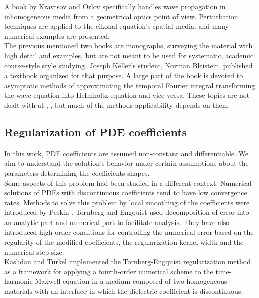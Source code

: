 \documentclass[12pt,twoside]{report}
\begin{document}
A book by Kravtsov and Orlov \cite{KravstovOrlov1990} specifically handles wave propagation in inhomogeneous media from a geometrical optics point of view. Perturbation techniques are applied to the eikonal equation's spatial media. and many numerical examples are presented. \\

The previous mentioned two books are monographs, surveying the material with high detail and examples, but are not meant to be used for systematic, academic course-style style studying. Joseph Keller's student, Norman Bleistein, published a textbook \cite{Bleistein1984} organized for that purpose. A large part of the book is devoted to asymptotic methods of approximating the temporal Fourier integral transforming the wave equation into Helmholtz equation and vice versa. These topics are not dealt with at \cite{Keller1995}, \cite{KravstovOrlov1990}, but much  of the methods applicability depends on them. 

\subsection{Regularization of PDE coefficients}
In this work, PDE coefficients are assumed non-constant and differentiable. We aim to understand the solution's behavior under certain assumptions about the parameters determining the coefficients shapes. \\
Some aspects of this problem had been studied in a different context. Numerical solutions of PDEs with discontinuous coefficients tend to have low convergence rates. Methods to solve this problem by local smoothing of the coefficients were introduced by Peskin \cite{Peskin1977, Peskin2002}. Tornberg and Engquist \cite{TornbergEngquist2003} used decomposition of error into an analytic part and numerical part to facilitate analysis. They have also introduced high order conditions for controlling the numerical error based on the regularity of the modified coefficients, the regularization kernel width and the numerical step size.\\
Kashdan and Turkel \cite{KashdanTurkel2006} implemented the Tornberg-Engquist regularization method as a framework for applying a fourth-order numerical scheme to the time-harmonic Maxwell equation in a medium composed of two homogeneous materials with an interface in which the dielectric coefficient is discontinuous.
\end{document}
